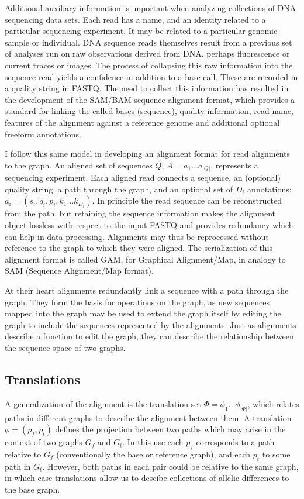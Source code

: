 Additional auxiliary information is important when analyzing collections of DNA sequencing data sets.
Each read has a name, and an identity related to a particular sequencing experiment.
It may be related to a particular genomic sample or individual.
DNA sequence reads themselves result from a previous set of analyses run on raw observations derived from DNA, perhaps fluorescence or current traces or images.
The process of collapsing this raw information into the sequence read yields a confidence in addition to a base call.
These are recorded in a quality string in FASTQ.
The need to collect this information has resulted in the development of the SAM/BAM sequence alignment format, which provides a standard for linking the called bases (sequence), quality information, read name, features of the alignment against a reference genome and additional optional freeform annotations.

I follow this same model in developing an alignment format for read alignments to the graph.
An aligned set of sequences $Q$, $A = a_1 \ldots a_{|Q|}$, represents a sequencing experiment.
Each aligned read connects a sequence, an (optional) quality string, a path through the graph, and an optional set of $D_i$ annotations: $a_i = (s_i, q_i, p_i, k_1\ldots k_{D_i})$.
In principle the read sequence can be reconstructed from the path, but retaining the sequence information makes the alignment object lossless with respect to the input FASTQ and provides redundancy which can help in data processing.
Alignments may thus be reprocessed without reference to the graph to which they were aligned.
The serialization of this alignment format is called GAM, for Graphical Alignment/Map, in analogy to SAM (Sequence Alignment/Map format).

At their heart alignments redundantly link a sequence with a path through the graph.
They form the basis for operations on the graph, as new sequences mapped into the graph may be used to extend the graph itself by editing the graph to include the sequences represented by the alignments.
Just as alignments describe a function to edit the graph, they can describe the relationship between the sequence space of two graphs.

\subsection{Translations}
\label{sec:translation}

A generalization of the alignment is the translation set $\Phi = \phi_1 \ldots \phi_{|\Phi|}$, which relates paths in different graphs to describe the alignment between them.
A translation $\phi = (p_f, p_t)$ defines the projection between two paths which may arise in the context of two graphs $G_f$ and $G_t$.
In this use each $p_f$ corresponds to a path relative to $G_f$ (conventionally the base or reference graph), and each $p_t$ to some path in $G_t$.
However, both paths in each pair could be relative to the same graph, in which case translations allow us to descibe collections of allelic differences to the base graph.


